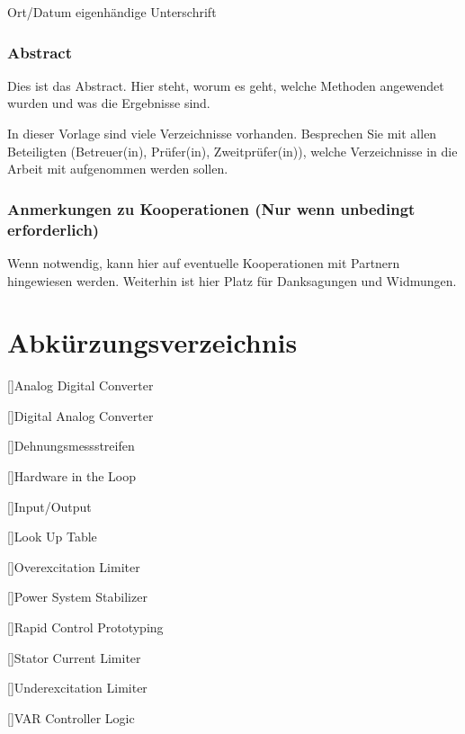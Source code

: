 \vspace{15mm}
Ort/Datum eigenhändige Unterschrift

\newpage{}

\subsection*{Abstract}

Dies ist das Abstract. Hier steht, worum es geht, welche Methoden
angewendet wurden und was die Ergebnisse sind.

In dieser Vorlage sind viele Verzeichnisse vorhanden. Besprechen Sie
mit allen Beteiligten (Betreuer(in), Prüfer(in), Zweitprüfer(in)),
welche Verzeichnisse in die Arbeit mit aufgenommen werden sollen.

\subsection*{Anmerkungen zu Kooperationen (Nur wenn unbedingt erforderlich)}

Wenn notwendig, kann hier auf eventuelle Kooperationen mit Partnern
hingewiesen werden. Weiterhin ist hier Platz für Danksagungen und
Widmungen.

\tableofcontents{}

\chapter*{Abkürzungsverzeichnis}

\begin{multicols}{2}
\raggedcolumns
\begin{acronym}[aaaaaaaa]
\setlength{\itemsep}{-\parsep}

[]{Analog Digital Converter}

[]{Digital Analog Converter}

[]{Dehnungsmessstreifen}

[]{Hardware in the Loop}

[]{Input/Output}

[]{Look Up Table}

[]{Overexcitation Limiter}

[]{Power System Stabilizer}

[]{Rapid Control Prototyping}

[]{Stator Current Limiter}

[]{Underexcitation
Limiter}

[]{VAR Controller Logic}

\end{acronym}
\end{multicols} 

